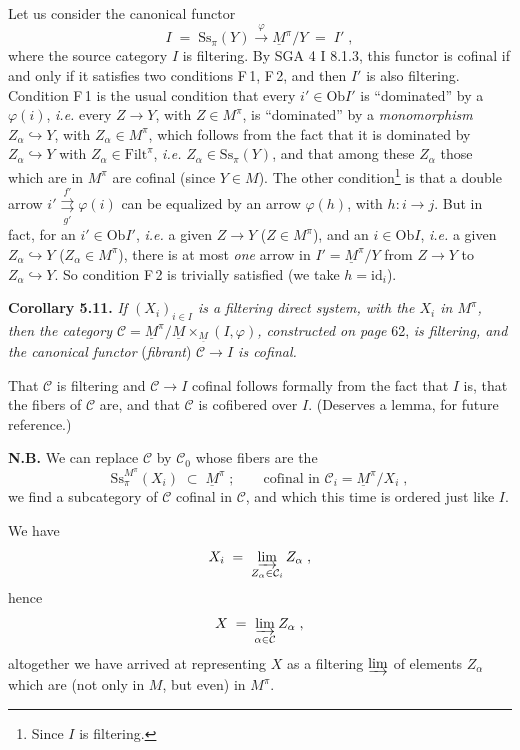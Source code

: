 \documentclass[11pt]{article}
\newcommand{\printedpage}[1]{\marginpar{\footnotesize p.~#1}}
\newcommand{\msp}[1]{\marginpar{\footnotesize [#1]}}
\newcommand{\Filt}{\mathrm{Filt}}
\newcommand{\Ob}{\mathrm{Ob}}
\newcommand{\Ss}{\mathrm{Ss}}
\newcommand{\Ci}{\mathcal{C}}
\begin{document}
Let us consider the canonical functor
\[
I \;=\; \Ss_\pi(Y) \xrightarrow{\;\varphi\;} \underline{M}^\pi/Y \;=\; I' \;,
\]
where the source category $I$ is filtering. By SGA 4 I 8.1.3, this functor is cofinal if and only if it satisfies two conditions F\,1, F\,2, and then $I'$ is also filtering. Condition F\,1 is the usual condition that every $i' \in \Ob I'$ is ``dominated'' by a $\varphi(i)$, \textit{i.e.} every $Z \longrightarrow Y$, with $Z \in M^\pi$, is ``dominated'' by a \textit{monomorphism} $Z_\alpha \hookrightarrow Y$, with $Z_\alpha \in M^\pi$, which follows from the fact that it is dominated by $Z_\alpha \hookrightarrow Y$ with $Z_\alpha \in \Filt^\pi$, \textit{i.e.} $Z_\alpha \in \Ss_\pi(Y)$, and that among these $Z_\alpha$ those which are in $M^\pi$ are cofinal (since $Y \in M$). The other condition\footnote[23]{Since $I$ is filtering.} is that a double arrow $i' \overset{f'}{\underset{g'}{\rightrightarrows}} \varphi(i)$ can
\msp{page 64}
be equalized by an arrow $\varphi(h)$, with $h : i \longrightarrow j$. But in fact, for an $i' \in \Ob I'$, \textit{i.e.} a given $Z \longrightarrow Y$ ($Z \in M^\pi$), and an $i \in \Ob I$, \textit{i.e.} a given $Z_\alpha \hookrightarrow Y$ ($Z_\alpha \in M^\pi$), there is at most \textit{one} arrow in $I' = \underline{M}^\pi/Y$ from $Z \longrightarrow Y$ to $Z_\alpha \hookrightarrow Y$. So condition F\,2 is trivially satisfied (we take $h = \mathrm{id}_i$).

\textbf{Corollary 5.11.} \textit{If $(X_i)_{i \in I}$ is a filtering direct system, with the $X_i$ in $M^\pi$, then the category $\Ci = \underline{M}^\pi/\underline{M} \times_{\underline{M}} (I,\varphi)$, constructed on page} 62, \textit{is filtering, and the canonical functor} (\textit{fibrant}) \textit{$\Ci \longrightarrow I$ is cofinal.}

That $\Ci$ is filtering and $\Ci \longrightarrow I$ cofinal follows formally from the fact that $I$ is, that the fibers of $\Ci$ are, and that $\Ci$ is cofibered over $I$. (Deserves a lemma, for future reference.)

\textbf{N.B.} We can replace $\Ci$ by $\Ci_0$ whose fibers are the
\[
\Ss_\pi^{M^\pi}(X_i) \;\subset\; \underline{M}^\pi \;; \qquad \text{cofinal in } \Ci_i = \underline{M}^\pi/X_i \;,
\]
\msp{page 65}
we find a subcategory of $\Ci$ cofinal in $\Ci$, and which this time is ordered just like $I$.

\printedpage{38}
We have
\[
X_i \;=\; \varinjlim_{Z_\alpha \in \Ci_i} Z_\alpha \;,
\]
hence
\[
X \;=\; \varinjlim_{\alpha \in \Ci} Z_\alpha \;,
\]
altogether we have arrived at representing $X$ as a filtering $\varinjlim$ of elements $Z_\alpha$ which are (not only in $M$, but even) in $M^\pi$.
\end{document}
